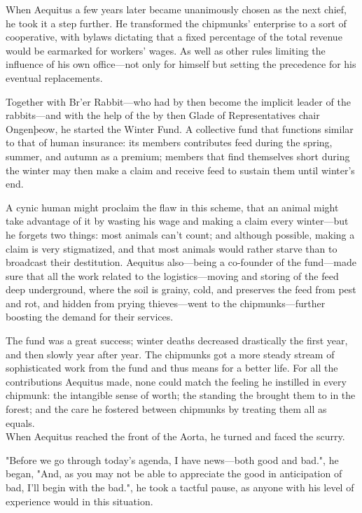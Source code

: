 When Aequitus a few years later became unanimously chosen as the next chief, he took it a step further. He transformed the chipmunks' enterprise to a sort of cooperative, with bylaws dictating that a fixed percentage of the total revenue would be earmarked for workers' wages. As well as other rules limiting the influence of his own office---not only for himself but setting the precedence for his eventual replacements. 

Together with Br'er Rabbit---who had by then become the implicit leader of the rabbits---and with the help of the by  then Glade of Representatives chair Ongenþeow, he started the Winter Fund. A collective fund that functions similar to that of human insurance: its members contributes feed during the spring, summer, and autumn as a premium; members that find themselves short during the winter may then make a claim and receive feed to sustain them until winter's end. %

A cynic human might proclaim the flaw in this scheme, that an animal might take advantage of it by wasting his wage and making a claim every winter---but he forgets two things: most animals can't count; and although possible, making a claim is very stigmatized, and that most animals would rather starve than to broadcast their destitution. Aequitus also---being a co-founder of the fund---made sure that all the work related to the logistics---moving and storing of the feed deep underground, where the soil is grainy, cold, and preserves the feed from pest and rot, and hidden from prying thieves---went to the chipmunks---further boosting the demand for their services.

The fund was a great success; winter deaths decreased drastically the first year, and then slowly year after year. The chipmunks got a more steady stream of sophisticated work from the fund and thus means for a better life. For all the contributions Aequitus made, none could match the feeling he instilled in every chipmunk: the intangible sense of worth; the standing the brought them to in the forest; and the care he fostered between chipmunks by treating them all as equals.\\

When Aequitus reached the front of the Aorta, he turned and faced the scurry.

"Before we go through today's agenda, I have news---both good and bad.", he began, "And, as you may not be able to appreciate the good in anticipation of bad, I'll begin with the bad.", he took a tactful pause, as anyone with his level of experience would in this situation.

